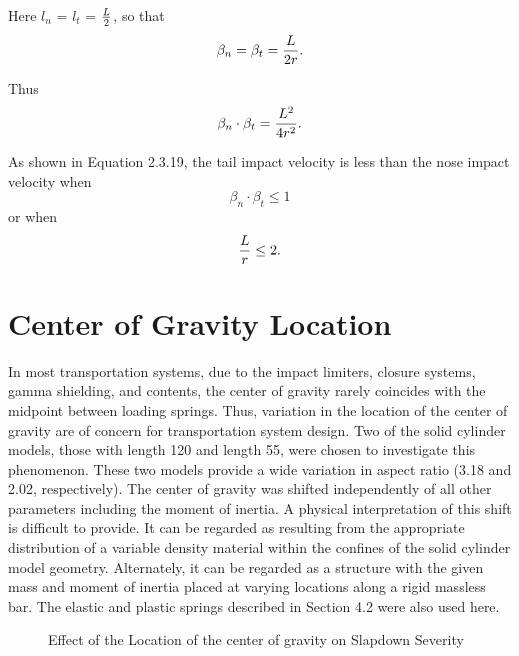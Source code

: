 Here $l_{n}$ = $l_{t}$ = ${{L}\over{2}}$, so that
\begin{equation}
\beta_{n} = \beta_{t} = {{L}\over{2r}}.
\end{equation}

Thus
\begin{equation}
\beta_{n}\cdot\beta_{t} = {{L^{2}}\over{4r^{2}}}.
\end{equation}

As shown in Equation 2.3.19, the tail impact velocity is less than the 
nose impact velocity when 
\begin{equation}
\beta_{n} \cdot \beta_{t}\leq 1
\end{equation}
or when
\begin{equation}
{{L}\over{r}} \leq 2.
\end{equation}

\section{Center of Gravity Location}

     In most
transportation systems, due to the impact limiters, closure
systems, gamma shielding, and contents, the center of gravity rarely
coincides with the midpoint between loading springs. Thus, 
variation in the location of the center of gravity 
are of concern for transportation system design.  Two of the solid
cylinder models, those with length 120 and length 55, were chosen to
investigate this phenomenon.  These two models provide a wide
variation in aspect ratio (3.18 and 2.02, respectively).  The
center of gravity was shifted independently of all other parameters
including the moment of inertia. A physical interpretation of this
shift is difficult to provide.  It can be regarded as resulting from
the appropriate distribution of a variable density material within the
confines of the solid cylinder model geometry.  Alternately, it can be
regarded as a structure with the given mass and moment of inertia
placed at varying locations along a rigid massless bar. The elastic
and plastic springs described in Section 4.2 were also used here. 

\begin{figure}
\vspace{3.5 in}
\caption{Effect of the Location of the center of gravity on Slapdown 
Severity}
\end{figure}

